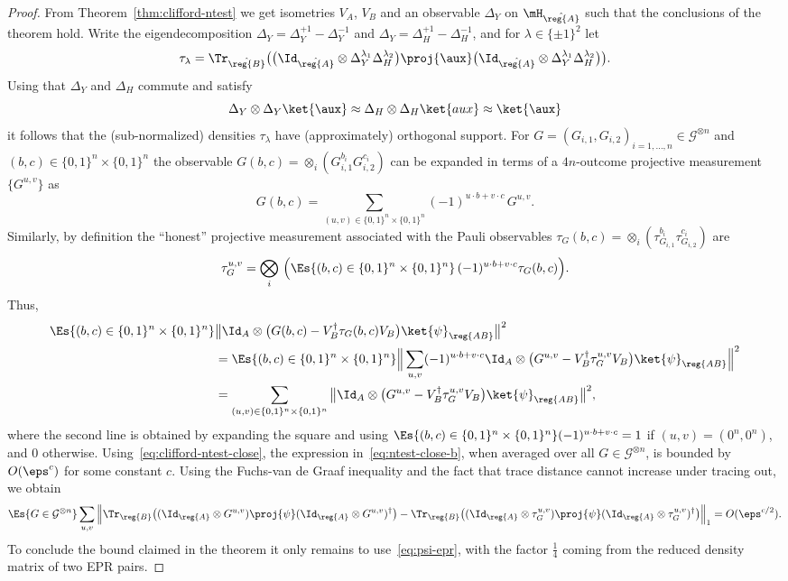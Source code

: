 \begin{proof}
From Theorem~\ref{thm:clifford-ntest} we get isometries $V_A$, $V_B$ and an observable $\Delta_Y$ on ${\mH}_{\hat{\reg{A}}}$ such that the conclusions of the theorem hold. Write the eigendecomposition $\Delta_Y = \Delta_Y^{+1}-\Delta_Y^{-1}$ and $\Delta_Y = \Delta_H^{+1}-\Delta_H^{-1}$, and for $\lambda \in \{\pm 1\}^2$ let
$$\tau_{\lambda} = \Tr_{\hat{\reg{B}}}\big( \big(\Id_{\hat{\reg{A}}}\otimes \Delta_Y^{\lambda_1}\Delta_H^{\lambda_2} \big)\proj{\aux}\big(\Id_{\hat{\reg{A}}}\otimes \Delta_Y^{\lambda_1}\Delta_H^{\lambda_2}\big)\big).$$
Using that $\Delta_Y$ and $\Delta_H$ commute and satisfy 
$$\Delta_Y \otimes \Delta_Y \ket{\aux} \approx \Delta_H\otimes \Delta_H \ket{aux} \approx \ket{\aux}$$
 it follows that the (sub-normalized) densities $\tau_{\lambda}$ have (approximately) orthogonal support. 
For $G=(G_{i,1},G_{i,2})_{i=1,\ldots,n}\in \mathcal{G}^{\otimes n}$ and $(b,c)\in \{0,1\}^n \times \{0,1\}^n$ the observable $G(b,c) = \otimes_i (G_{i,1}^{b_i}G_{i,2}^{c_i})$ can be expanded in terms of a $4n$-outcome projective measurement $\{G^{u,v}\}$ as 
$$G(b,c) = \sum_{(u,v)\in \{0,1\}^n\times\{0,1\}^{n}}  (-1)^{u\cdot b+ v\cdot c} \,G^{u,v}.$$
Similarly, by definition the ``honest'' projective measurement associated with the Pauli observables $\tau_G(b,c) = \otimes_i (\tau_{G_{i,1}}^{b_i}\tau_{G_{i,2}}^{c_i})$ are 
$$\tau_G^{u,v} = \bigotimes_i \,\Big(\Es{(b,c)\in \{0,1\}^n\times\{0,1\}^n} \,(-1)^{u\cdot b + v\cdot c} \tau_G(b,c)\Big).$$ 
Thus,
\begin{align}
\Es{(b,c)\in\{0,1\}^n\times\{0,1\}^n} & \big\| \Id_A \otimes \big(  G(b,c) - V_B^\dagger \tau_{G}(b,c) V_B\big)   \ket{\psi}_{\reg{AB}} \big\|^2\notag\\
&= \Es{(b,c)\in\{0,1\}^n\times\{0,1\}^n}\Big\| \sum_{u,v} (-1)^{u\cdot b+v\cdot c} \Id_A \otimes \big(  G^{u,v} - V_B^\dagger\tau_{G}^{u,v} V_B\big)   \ket{\psi}_{\reg{AB}} \Big\|^2    \notag\\
&= \sum_{(u,v)\in\{0,1\}^n\times\{0,1\}^n}\big\|  \Id_A \otimes \big(  G^{u,v} - V_B^\dagger\tau_{G}^{u,v} V_B\big)   \ket{\psi}_{\reg{AB}} \big\|^2, \label{eq:ntest-close-b}  
\end{align}
where the second line is obtained by expanding the square and using $\Es{(b,c)\in\{0,1\}^n\times\{0,1\}^n} (-1)^{u \cdot b+v\cdot c} = 1$ if $(u,v)=(0^n,0^n)$, and $0$ otherwise. Using~\eqref{eq:clifford-ntest-close}, the expression in~\eqref{eq:ntest-close-b}, when averaged over all $G\in\mathcal{G}^{\otimes n}$, is bounded by $O(\eps^c)$ for some constant $c$. Using the Fuchs-van de Graaf inequality and the fact that trace distance cannot increase under tracing out, we obtain 
$$\Es{G\in\mathcal{G}^{\otimes n}}\sum_{u,v} \Big\| \Tr_\reg{B}\big( (\Id_\reg{A} \otimes G^{u,v})\proj{\psi}(\Id_\reg{A} \otimes G^{u,v})^\dagger \big) - \Tr_\reg{B}\big( (\Id_\reg{A} \otimes \tau_G^{u,v})\proj{\psi}(\Id_\reg{A} \otimes \tau_G^{u,v})^\dagger \big) \Big\|_1 = O(\eps^{c/2}).$$
To conclude the bound claimed in the theorem it only remains to use~\eqref{eq:psi-epr}, with the factor $\frac{1}{4}$ coming from the reduced density matrix of two EPR pairs.
\end{proof}


